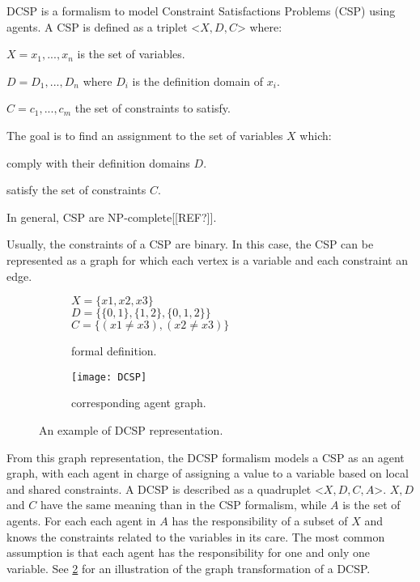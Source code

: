DCSP is a formalism to model Constraint Satisfactions Problems (CSP) using agents. A CSP is defined as a triplet <$X,D,C$> where:
\begin{compactitem}
\item $X = {x_1, ..., x_n}$ is the set of variables.
\item $D = {D_1, ..., D_n}$ where $D_i$ is the definition domain of $x_i$.
\item $C ={c_1, ..., c_m}$ the set of constraints to satisfy.
\end{compactitem}

The goal is to find an assignment to the set of variables $X$ which:
\begin{compactitem}
\item comply with their definition domains $D$.
\item satisfy the set of constraints $C$.
\end{compactitem}

In general, CSP are NP-complete[[REF?]].

Usually, the constraints of a CSP are binary. In this case, the CSP can be represented as a graph for which each vertex is a variable and each constraint an edge.

\begin{figure}[]
\centering
	\begin{subfigure}[b]{0.35\textwidth}
			$X = \{x1, x2, x3\}$\\
			$D = \{\{0,1\}, \{1,2\}, \{0,1,2\}\}$\\
			$C = \{(x1 \neq x3), (x2 \neq x3)\}$		
		\caption{formal definition.}
	\end{subfigure}
	\begin{subfigure}[b]{0.45\textwidth}
			\centering
			\texttt{[image: DCSP]}
			\caption{corresponding agent graph.}\label{dcsp:graph}
	\end{subfigure}

\caption{An example of DCSP representation.}
\label{dcsp}

\end{figure}

From this graph representation, the DCSP formalism\cite{yokoo1998distributed} models a CSP  as an agent graph, with each agent in charge of assigning a value to a variable based on local and shared constraints. A DCSP is described as a quadruplet <$X, D, C, A$>. $X, D$ and $C$ have the same meaning than in the CSP formalism, while $A$ is the set of agents. For each each agent in $A$ has the responsibility of a subset of $X$ and knows the constraints related to the variables in its care. The most common assumption is that each agent has the responsibility for one and only one variable. See \figurename{} \ref{dcsp} for an illustration of the graph transformation of a DCSP.

